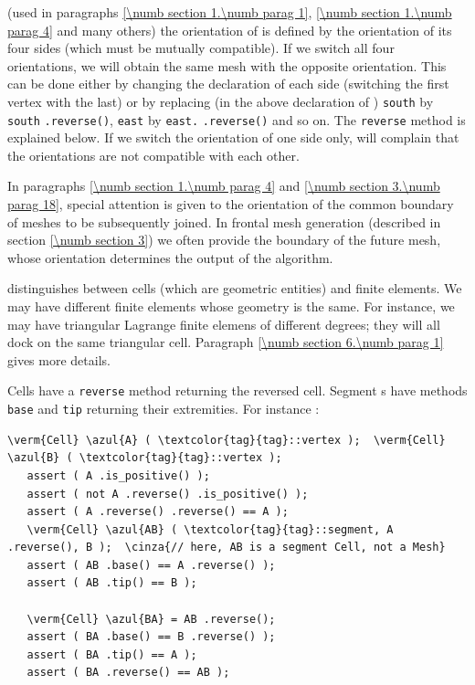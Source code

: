 \noindent (used in paragraphs \ref{\numb section 1.\numb parag 1},
\ref{\numb section 1.\numb parag 4} and many others)
the orientation of {\small\tt{}} is defined by the orientation of
its four sides (which must be mutually compatible).
If we switch all four orientations, we will obtain the same mesh with the opposite orientation.
This can be done either by changing the declaration of each side (switching the first vertex with
the last) or by replacing (in the above declaration of {\small\tt{}})
{\small\tt south} by {\small\tt south} {\small\tt .reverse()},
{\small\tt east} by {\small\tt east.} {\small\tt .reverse()} and so on.
The {\small\tt reverse} method is explained below.
If we switch the orientation of one side only, {\maniFEM} will complain that
the orientations are not compatible with each other.

In paragraphs \ref{\numb section 1.\numb parag 4} and \ref{\numb section 3.\numb parag 18},
special attention is given to the orientation of the common boundary of meshes to be
subsequently joined.
In frontal mesh generation (described in section \ref{\numb section 3}) we often
provide the boundary of the future mesh, whose orientation determines the output of the
algorithm.

{\ManiFEM} distinguishes between cells (which are geometric entities) and finite elements.
We may have different finite elements whose geometry is the same.
For instance, we may have triangular Lagrange finite elemens of different degrees;
they will all dock on the same triangular cell.
Paragraph \ref{\numb section 6.\numb parag 1} gives more details.

Cells have a {\small\tt reverse} method returning the reversed cell.
Segment {\small\tt{}}s have methods {\small\tt base} and {\small\tt tip}
returning their extremities.
For instance :

\begin{Verbatim}[commandchars=\\\{\},formatcom=\small\tt,baselinestretch=0.94]
   \verm{Cell} \azul{A} ( \textcolor{tag}{tag}::vertex );  \verm{Cell} \azul{B} ( \textcolor{tag}{tag}::vertex );
   assert ( A .is_positive() );
   assert ( not A .reverse() .is_positive() );
   assert ( A .reverse() .reverse() == A );
   \verm{Cell} \azul{AB} ( \textcolor{tag}{tag}::segment, A .reverse(), B );  \cinza{// here, AB is a segment Cell, not a Mesh}
   assert ( AB .base() == A .reverse() );
   assert ( AB .tip() == B );

   \verm{Cell} \azul{BA} = AB .reverse();
   assert ( BA .base() == B .reverse() );
   assert ( BA .tip() == A );
   assert ( BA .reverse() == AB );
\end{Verbatim}

